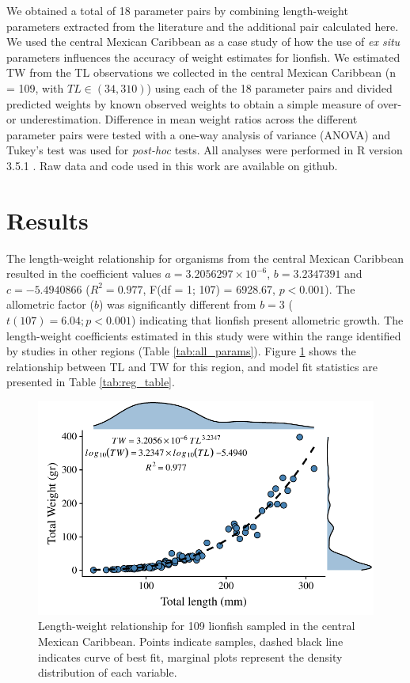 \documentclass[fleqn,10pt,lineno]{wlpeerj} %
\begin{document}
We obtained a total of 18 parameter pairs by combining length-weight
parameters extracted from the literature and the additional pair
calculated here. We used the central Mexican Caribbean as a case study
of how the use of \emph{ex situ} parameters influences the accuracy of
weight estimates for lionfish. We estimated TW from the TL observations
we collected in the central Mexican Caribbean (n = 109, with
\(TL \in (34, 310)\)) using each of the 18 parameter pairs and divided
predicted weights by known observed weights to obtain a simple measure
of over- or underestimation. Difference in mean weight ratios across the
different parameter pairs were tested with a one-way analysis of
variance (ANOVA) and Tukey's test was used for \emph{post-hoc} tests.
All analyses were performed in R version 3.5.1 \citep{rcore_2018}. Raw
data and code used in this work are available on github.

\section*{Results}

The length-weight relationship for organisms from the central Mexican
Caribbean resulted in the coefficient values
\(a = 3.2056297\times 10^{-6}\), \(b = 3.2347391\) and
\(c = -5.4940866\) (\(R^2 = 0.977\), F(df = 1; 107) = 6928.67,
\(p < 0.001\)). The allometric factor (\(b\)) was significantly
different from \(b = 3\) (\(t(107) = 6.04; p<0.001\)) indicating that
lionfish present allometric growth. The length-weight coefficients
estimated in this study were within the range identified by studies in
other regions (Table \ref{tab:all_params}). Figure \ref{fig:l-w-carib}
shows the relationship between TL and TW for this region, and model fit
statistics are presented in Table \ref{tab:reg_table}.

\begin{figure}
\centering
\includegraphics{Manuscript_files/figure-latex/fit1-1.pdf}
\caption{\label{fig:l-w-carib}Length-weight relationship for 109
lionfish sampled in the central Mexican Caribbean. Points indicate
samples, dashed black line indicates curve of best fit, marginal plots
represent the density distribution of each variable.}
\end{figure}
\end{document}

